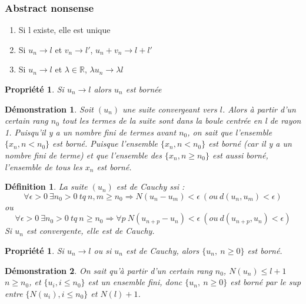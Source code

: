 \documentclass[a4paper, oneside]{report}
\theoremstyle{break}
\newtheorem{defi}[thm]{Définition}
\newtheorem{propr}[thm]{Propriété}
\newtheorem*{demo}{Démonstration}
\newcommand{\R}{\mathbb{R}}
\begin{document}
\subsubsection{Abstract nonsense}

\begin{enumerate}
\item Si l existe, elle est unique
\item Si $u_n \rightarrow l$ et $v_n\rightarrow l'$, $u_n+v_n \rightarrow l+l'$
\item Si $u_n \rightarrow l$ et $\lambda \in \R$, $\lambda u_n \rightarrow \lambda l$
\end{enumerate}

\begin{propr}
Si $u_n\rightarrow l$ alors $u_n$ est bornée
\end{propr}


\begin{demo}
Soit $(u_n)$ une suite convergeant vers $l$.
Alors à partir d'un certain rang $n_0$ tout les termes de la suite sont dans la boule centrée en l de rayon 1.
Puisqu'il y a un nombre fini de termes avant $n_0$, on sait que l'ensemble $\{x_n, n < n_0\}$ est borné.
Puisque l'ensemble $\{x_n,  n < n_0\}$ est borné (car il y a un nombre fini de terme) et que l'ensemble des $\{x_n,  n \geq n_0\}$ est aussi borné, l'ensemble de tous les $x_n$ est borné.
\end{demo}


\begin{defi}                    

La suite $(u_n)$ est de Cauchy ssi :
$$\forall \epsilon >0~ \exists n_0>0~tq~n,m\geq n_0 \Rightarrow N(u_n-u_m)<\epsilon~(ou~d(u_n,u_m)<\epsilon)$$
ou 
$$\forall \epsilon >0~ \exists n_0>0~tq~n\geq n_0 \Rightarrow \forall p~N(u_{n+p}-u_n)<\epsilon~(ou~d(u_{n+p},u_n)<\epsilon)$$
Si $u_n$ est convergente, elle est de Cauchy.
\end{defi}

\begin{propr}

Si $u_n \rightarrow l$ ou si $u_n$ est de Cauchy, alors $\{u_n,~n\geq 0 \}$ est borné.
\end{propr}


\begin{demo}
On sait qu'à partir d'un certain rang $n_0$, $N(u_n) \leq l+1$ $n\geq n_0$, et $\{u_i, i\leq n_0 \}$ est un ensemble fini, donc $\{u_n,~n\geq 0 \}$ est borné par le sup entre $\{N(u_i), i\leq n_0 \}$ et $N(l)+1$.
\end{demo}
\end{document}
